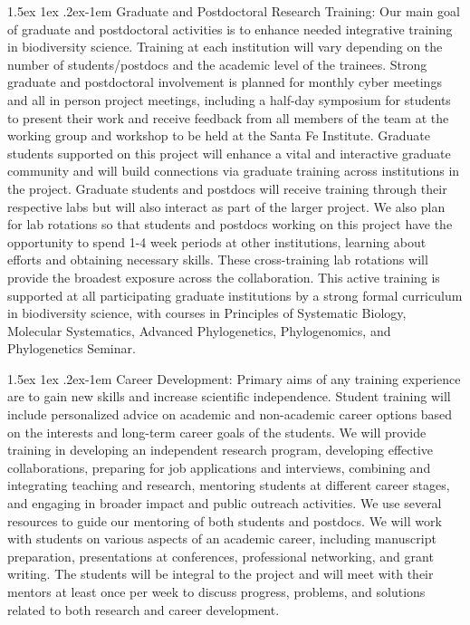 \documentclass[11pt]{article}
\makeatletter
\renewcommand{\paragraph}{\@startsection{paragraph}{4}{\z@}
  {1.5ex \@plus 1ex \@minus .2ex}{-1em}
  {\normalfont\normalsize\it}
}
\makeatother
\begin{document}
\paragraph{Graduate and Postdoctoral Research Training:} Our main goal
of graduate and postdoctoral activities is to enhance needed
integrative training in biodiversity science.  Training at each
institution will vary depending on the number of students/postdocs and
the academic level of the trainees. Strong graduate and postdoctoral
involvement is planned for monthly cyber meetings and all in person
project meetings, including a half-day symposium for students to
present their work and receive feedback from all members of the team
at the working group and workshop to be held at the Santa Fe
Institute. Graduate students supported on this project will enhance a
vital and interactive graduate community and will build connections
via graduate training across institutions in the project. Graduate
students and postdocs will receive training through their respective
labs but will also interact as part of the larger project.  We also
plan for lab rotations so that students and postdocs working on this
project have the opportunity to spend 1-4 week periods at other
institutions, learning about efforts and obtaining necessary skills.
These cross-training lab rotations will provide the broadest exposure
across the collaboration. This active training is supported at all
participating graduate institutions by a strong formal curriculum in
biodiversity science, with courses in Principles of Systematic
Biology, Molecular Systematics, Advanced Phylogenetics, Phylogenomics,
and Phylogenetics Seminar.

\paragraph{Career Development:} Primary aims of any training
experience are to gain new skills and increase scientific
independence. Student training will include personalized advice on
academic and non-academic career options based on the interests and
long-term career goals of the students. We will provide training in
developing an independent research program, developing effective
collaborations, preparing for job applications and interviews,
combining and integrating teaching and research, mentoring students at
different career stages, and engaging in broader impact and public
outreach activities. We use several resources to guide our mentoring
of both students and postdocs. We will work with students on various
aspects of an academic career, including manuscript preparation,
presentations at conferences, professional networking, and grant
writing. The students will be integral to the project and will meet
with their mentors at least once per week to discuss progress,
problems, and solutions related to both research and career
development.
\end{document}
